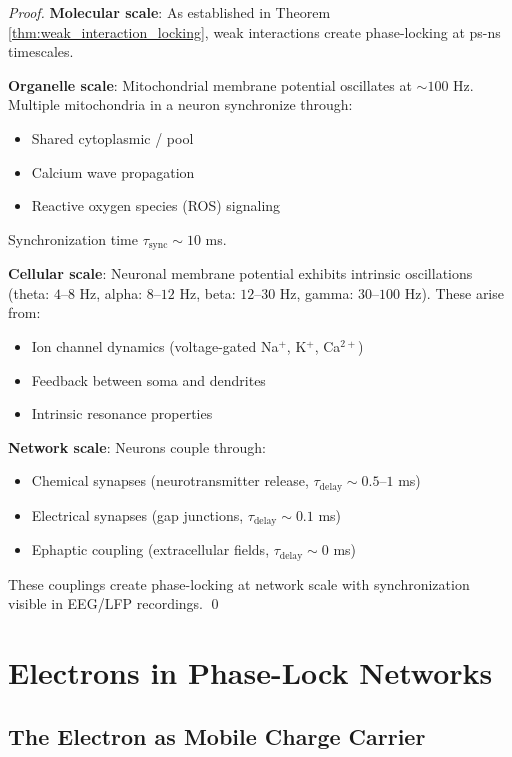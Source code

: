 \documentclass[12pt,a4paper]{article}
\begin{document}
\begin{proof}
\textbf{Molecular scale}: As established in Theorem \ref{thm:weak_interaction_locking}, weak interactions create phase-locking at ps-ns timescales.

\textbf{Organelle scale}: Mitochondrial membrane potential oscillates at $\sim 100$ Hz. Multiple mitochondria in a neuron synchronize through:
\begin{itemize}
\item Shared cytoplasmic / pool
\item Calcium wave propagation
\item Reactive oxygen species (ROS) signaling
\end{itemize}
Synchronization time $\tau_{\text{sync}} \sim 10$ ms.

\textbf{Cellular scale}: Neuronal membrane potential exhibits intrinsic oscillations (theta: $4$--$8$ Hz, alpha: $8$--$12$ Hz, beta: $12$--$30$ Hz, gamma: $30$--$100$ Hz). These arise from:
\begin{itemize}
\item Ion channel dynamics (voltage-gated Na$^+$, K$^+$, Ca$^{2+}$)
\item Feedback between soma and dendrites
\item Intrinsic resonance properties
\end{itemize}

\textbf{Network scale}: Neurons couple through:
\begin{itemize}
\item Chemical synapses (neurotransmitter release, $\tau_{\text{delay}} \sim 0.5$--$1$ ms)
\item Electrical synapses (gap junctions, $\tau_{\text{delay}} \sim 0.1$ ms)
\item Ephaptic coupling (extracellular fields, $\tau_{\text{delay}} \sim 0$ ms)
\end{itemize}

These couplings create phase-locking at network scale with synchronization visible in EEG/LFP recordings. \qed
\end{proof}

\section{Electrons in Phase-Lock Networks}

\subsection{The Electron as Mobile Charge Carrier}
\end{document}
